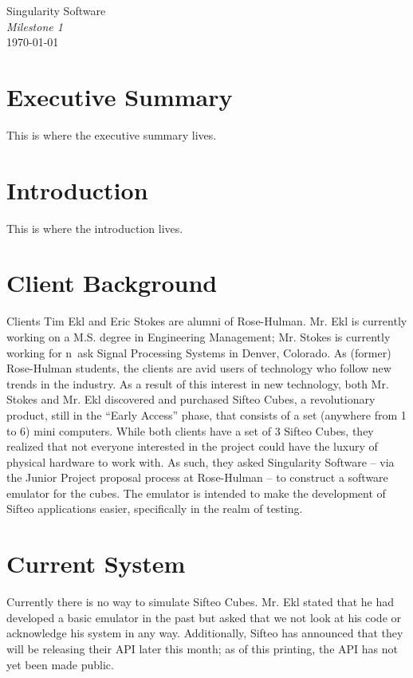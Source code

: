 \documentclass[12pt]{article}
\begin{document}
\vspace*{\fill}
        \begin{center}
                \LARGE{Singularity Software} \\
                \LARGE{\textit{Milestone 1}} \\
                \vspace{.15in}
                \large{\today} \\
        \end{center}
\vspace*{\fill}

\clearpage

\tableofcontents

\clearpage

\section{Executive Summary}
This is where the executive summary lives.

\section{Introduction}
This is where the introduction lives.

\section{Client Background}
Clients Tim Ekl and Eric Stokes are alumni of Rose-Hulman. Mr. Ekl is currently working on a M.S. degree in Engineering Management; Mr. Stokes is currently working for n~ask Signal Processing Systems in Denver, Colorado. As (former) Rose-Hulman students, the clients are avid users of technology who follow new trends in the industry. As a result of this interest in new technology, both Mr. Stokes and Mr. Ekl discovered and purchased Sifteo Cubes, a revolutionary product, still in the “Early Access” phase, that consists of a set (anywhere from 1 to 6) mini computers. While both clients have a set of 3 Sifteo Cubes, they realized that not everyone interested in the project could have the luxury of physical hardware to work with. As such, they asked Singularity Software – via the Junior Project proposal process at Rose-Hulman – to construct a software emulator for the cubes. The emulator is intended to make the development of Sifteo applications easier, specifically in the realm of testing.

\section{Current System}
Currently there is no way to simulate Sifteo Cubes. Mr. Ekl stated that he had developed a basic emulator in the past but asked that we not look at his code or acknowledge his system in any way. Additionally, Sifteo has announced that they will be releasing their API later this month; as of this printing, the API has not yet been made public.
\end{document}
